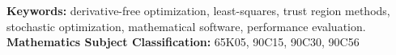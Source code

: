 \documentclass[a4paper]{article}
\numberwithin{equation}{section} %
\theoremstyle{plain}
\theoremstyle{definition}
\theoremstyle{remark}
\begin{document}
\textbf{Keywords:} derivative-free optimization, least-squares, trust region methods, stochastic optimization, mathematical software, performance evaluation.
\\

\textbf{Mathematics Subject Classification:} 65K05, 90C15, 90C30, 90C56 %

%
%



\appendix

%
%
%

\end{document}
